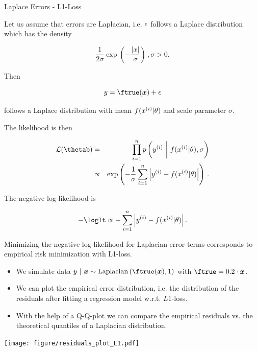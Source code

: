 \begin{vbframe}{Laplace Errors - L1-Loss}

Let us assume that errors are Laplacian, i.e. $\epsilon$ follows a Laplace distribution which has the density 

$$
 \frac{1}{2\sigma} \exp\left(-\frac{|x|}{\sigma}\right)\,, \sigma > 0.
$$ 

Then

$$
y = \ftrue(\xv) + \eps 
$$

follows a Laplace distribution with mean $f(x^{(i)} | \theta)$ and scale parameter $\sigma$. 

\framebreak 

The likelihood is then 

\begin{eqnarray*}
\LL(\thetab) &=& \prod_{i=1}^n \pdf\left(\yi ~\bigg|~ \fxit, \sigma\right) \\ &\propto& \exp\left(-\frac{1}{\sigma}\sumin \left|\yi - \fxit\right|\right)\,.
\end{eqnarray*}


The negative log-likelihood is

$$
- \loglt \propto - \sumin \left|\yi - \fxit\right|.
$$

Minimizing the negative log-likelihood for Laplacian error terms corresponds to empirical risk minimization with L1-loss. 


\framebreak 

\begin{footnotesize}
\begin{itemize}
	\item We simulate data $y ~|~\xv \sim \text{Laplacian}\left(\ftrue(\xv), 1\right)$ with $\ftrue = 0.2 \cdot \xv$. 
\item We can plot the empirical error distribution, i.e. the distribution of the residuals after fitting a regression model w.r.t. $L1$-loss.
\item With the help of a Q-Q-plot we can compare the empirical residuals vs. the theoretical quantiles of a Laplacian distribution.  
\end{itemize}
\end{footnotesize}
\texttt{[image: figure/residuals\_plot\_L1.pdf]}

\end{vbframe}

